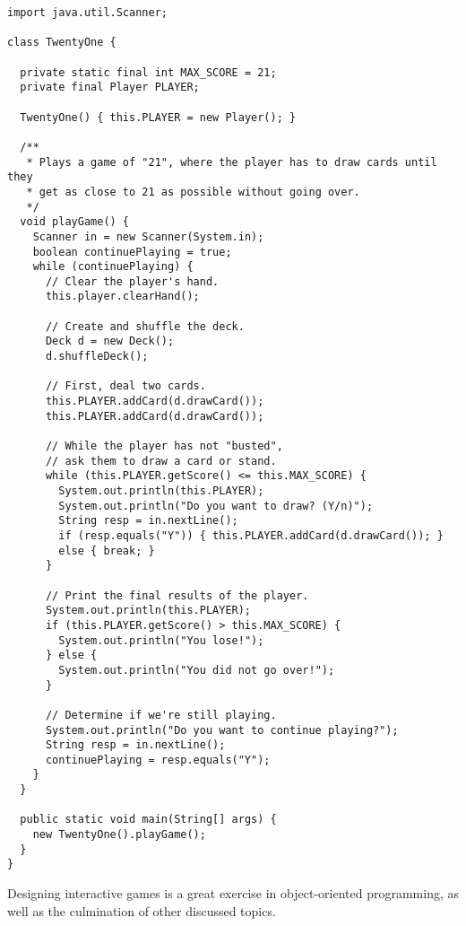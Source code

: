 \begin{lstlisting}[language=MyJava]
import java.util.Scanner;

class TwentyOne {

  private static final int MAX_SCORE = 21;
  private final Player PLAYER;

  TwentyOne() { this.PLAYER = new Player(); }

  /**
   * Plays a game of "21", where the player has to draw cards until they
   * get as close to 21 as possible without going over.
   */
  void playGame() {
    Scanner in = new Scanner(System.in);
    boolean continuePlaying = true;
    while (continuePlaying) {
      // Clear the player's hand.
      this.player.clearHand();

      // Create and shuffle the deck.
      Deck d = new Deck();
      d.shuffleDeck();

      // First, deal two cards.
      this.PLAYER.addCard(d.drawCard());
      this.PLAYER.addCard(d.drawCard());

      // While the player has not "busted", 
      // ask them to draw a card or stand.
      while (this.PLAYER.getScore() <= this.MAX_SCORE) {
        System.out.println(this.PLAYER);
        System.out.println("Do you want to draw? (Y/n)");
        String resp = in.nextLine();
        if (resp.equals("Y")) { this.PLAYER.addCard(d.drawCard()); }
        else { break; }
      }

      // Print the final results of the player.
      System.out.println(this.PLAYER);
      if (this.PLAYER.getScore() > this.MAX_SCORE) {
        System.out.println("You lose!");
      } else {
        System.out.println("You did not go over!");
      }

      // Determine if we're still playing.
      System.out.println("Do you want to continue playing?");
      String resp = in.nextLine();
      continuePlaying = resp.equals("Y");
    }
  }

  public static void main(String[] args) {
    new TwentyOne().playGame();
  }
}
\end{lstlisting}

Designing interactive games is a great exercise in object-oriented programming, as well as the culmination of other discussed topics.


